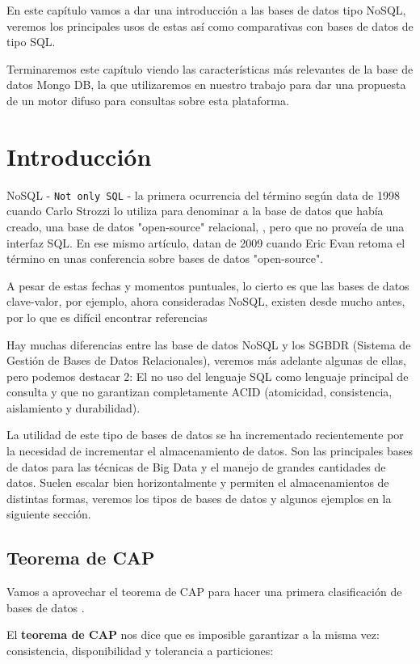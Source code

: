 En este capítulo vamos a dar una introducción a las bases de datos tipo NoSQL, veremos los principales usos de estas así como comparativas con bases de datos de tipo SQL.

Terminaremos este capítulo viendo las características más relevantes de la base de datos Mongo DB, la que utilizaremos en nuestro trabajo para dar una propuesta de un motor difuso para consultas sobre esta plataforma.

\section{Introducción}
NoSQL - \texttt{Not only SQL} - la primera ocurrencia del término  según \cite{chalmerthesis} data de 1998 cuando Carlo Strozzi lo utiliza para denominar a la base de datos que había creado, una base de datos "open-source" relacional, \cite{strozzidb}, pero que no proveía de una interfaz SQL. En ese mismo artículo, datan de 2009 cuando Eric Evan retoma el término en unas conferencia sobre bases de datos "open-source".

A pesar de estas fechas y momentos puntuales, lo cierto es que las bases de datos clave-valor, por ejemplo, ahora consideradas NoSQL, existen desde mucho antes, por lo que es difícil encontrar referencias

Hay muchas diferencias entre las base de datos NoSQL y los SGBDR (Sistema de Gestión de Bases de Datos Relacionales), veremos más adelante algunas de ellas, pero podemos destacar 2: El no uso del lenguaje SQL como lenguaje principal de consulta y que no garantizan completamente ACID (atomicidad, consistencia, aislamiento y durabilidad).

La utilidad de este tipo de bases de datos se ha incrementado recientemente por la necesidad de incrementar el almacenamiento de datos. Son las principales bases de datos para las técnicas de Big Data y el manejo de grandes cantidades de datos. Suelen escalar bien horizontalmente y permiten el almacenamientos de distintas formas, veremos los tipos de bases de datos y algunos ejemplos en la siguiente sección.

\subsection{Teorema de CAP}
Vamos a aprovechar el teorema de CAP para hacer una primera clasificación de bases de datos \cite{captheorem}.

El \textbf{teorema de CAP} nos dice que es imposible garantizar a la misma vez: consistencia, disponibilidad y tolerancia a particiones:

